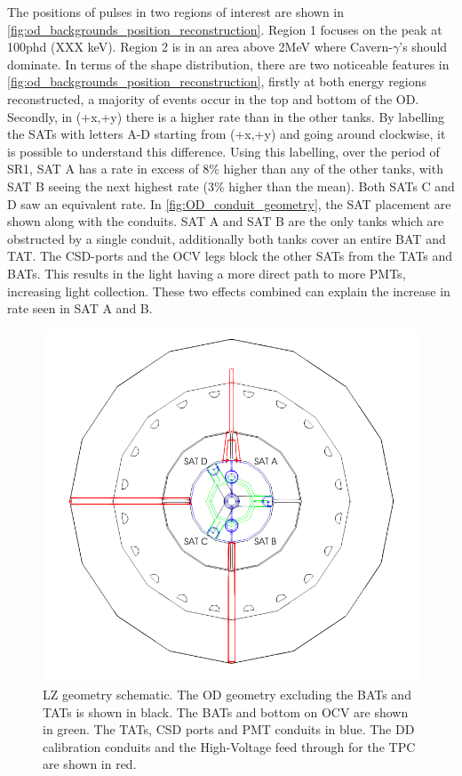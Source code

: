 \par
The positions of pulses in two regions of interest are shown in \autoref{fig:od_backgrounds_position_reconstruction}.
Region 1 focuses on the peak at 100phd (XXX keV).
Region 2 is in an area above 2MeV where Cavern-$\gamma$'s should dominate.
In terms of the shape distribution, there are two noticeable features in \autoref{fig:od_backgrounds_position_reconstruction}, firstly at both energy regions reconstructed, a majority of events occur in the top and bottom of the OD. 
Secondly, in (+x,+y) there is a higher rate than in the other tanks.
By labelling the SATs with letters A-D starting from (+x,+y) and going around clockwise, it is possible to understand this difference.
Using this labelling, over the period of SR1, SAT A has a rate in excess of 8\% higher than any of the other tanks, with SAT B seeing the next highest rate (3\% higher than the mean).
Both SATs C and D saw an equivalent rate.
In \autoref{fig:OD_conduit_geometry}, the SAT placement are shown along with the conduits.
SAT A and SAT B are the only tanks which are obstructed by a single conduit, additionally both tanks cover an entire BAT and TAT.
The CSD-ports and the OCV legs block the other SATs from the TATs and BATs.
This results in the light having a more direct path to more PMTs, increasing light collection.
These two effects combined can explain the increase in rate seen in SAT A and B.

\begin{figure}[!htbp]
\includegraphics[width=\textwidth]{Figures/Geometry/geometry_with_conduits.png}
\centering
\caption{LZ geometry schematic. The OD geometry excluding the BATs and TATs is shown in black. The BATs and bottom on OCV are shown in green. The TATs, CSD ports and PMT conduits in blue. The DD calibration conduits and the High-Voltage feed through for the TPC are shown in red.}
\label{fig:OD_conduit_geometry}
\end{figure}

